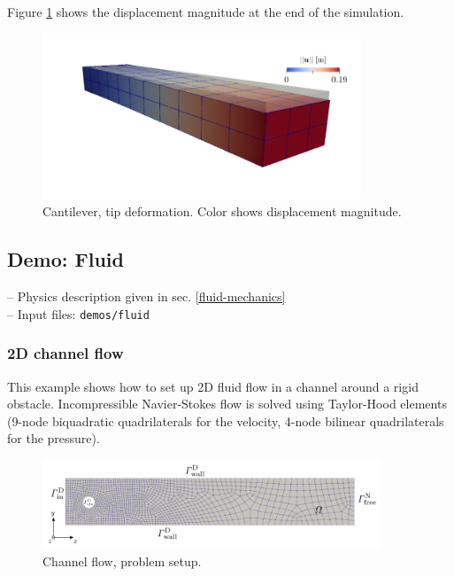 \documentclass[a4paper,12pt]{report}
\begin{document}
Figure \ref{fig:cantilever_results} shows the displacement magnitude at the end of the simulation.

\begin{figure}
\centering
\includegraphics[width=0.85\textwidth]{fig/cantilever_results.png}
\caption{Cantilever, tip deformation. Color shows displacement magnitude.}
\label{fig:cantilever_results}
\end{figure}


\subsection{Demo: Fluid}\label{demo-fluid}

-- Physics description given in sec. \ref{fluid-mechanics}\\

-- Input files: \verb"demos/fluid"

\subsubsection*{2D channel flow}

This example shows how to set up 2D fluid flow in a channel around a rigid obstacle. Incompressible Navier-Stokes flow is solved using Taylor-Hood elements
(9-node biquadratic quadrilaterals for the velocity, 4-node bilinear quadrilaterals for the pressure).

\begin{figure}
\centering
\includegraphics[width=0.9\textwidth]{fig/channel_setup.png}
\caption{Channel flow, problem setup.}
\label{fig:channel_setup}
\end{figure}
\end{document}
